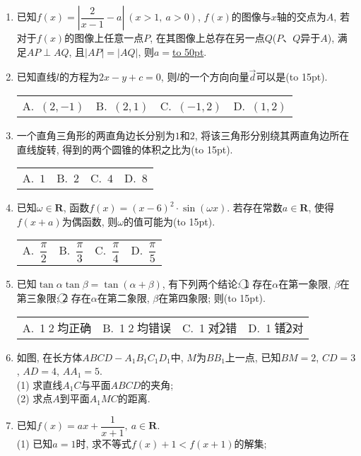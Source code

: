 \documentclass[10pt,a4paper]{article}
\newcommand{\blank}[1]{\underline{\hbox to #1pt{}}}
\newcommand{\bracket}[1]{(\hbox to #1pt{})}
\newcommand{\fourch}[4]{\par\begin{tabular}{p{.23\textwidth}p{.23\textwidth}p{.23\textwidth}p{.23\textwidth}}
A.~#1 &B.~#2& C.~#3& D.~#4
\end{tabular}}
\begin{document}
\begin{enumerate}[1.]
\item 已知$f(x)=\left|\dfrac{2}{x-1}-a\right| \ (x>1, \ a>0)$, $f(x)$的图像与$x$轴的交点为$A$, 若对于$f(x)$的图像上任意一点$P$, 在其图像上总存在另一点$Q$($P$、$Q$异于$A$), 满足$AP\perp AQ$, 且$|AP|=|AQ|$, 则$a=$\blank{50}.
\item 已知直线$l$的方程为$2x-y+c=0$, 则$l$的一个方向向量$\overrightarrow{d}$可以是\bracket{15}.
\fourch{$(2,-1)$}{$(2,1)$}{$(-1,2)$}{$(1,2)$}
\item 一个直角三角形的两直角边长分别为$1$和$2$, 将该三角形分别绕其两直角边所在直线旋转, 得到的两个圆锥的体积之比为\bracket{15}.
\fourch{$1$}{$2$}{$4$}{$8$}
\item 已知$\omega\in \mathbf{R}$, 函数$f(x)=(x-6)^2\cdot \sin (\omega x)$. 若存在常数$a\in \mathbf{R}$, 使得$f(x+a)$为偶函数, 则$\omega$的值可能为\bracket{15}.
\fourch{$\dfrac{\pi}{2}$}{$\dfrac{\pi}{3}$}{$\dfrac{\pi}{4}$}{$\dfrac{\pi}{5}$}
\item 已知$\tan\alpha\tan\beta=\tan(\alpha+\beta)$, 有下列两个结论: \textcircled{1} 存在$\alpha$在第一象限, $\beta$在第三象限; \textcircled{2} 存在$\alpha$在第二象限, $\beta$在第四象限; 则\bracket{15}.
\fourch{\textcircled{1}\textcircled{2}均正确}{\textcircled{1}\textcircled{2}均错误}{\textcircled{1}对\textcircled{2}错}{\textcircled{1}错\textcircled{2}对}
\item 如图, 在长方体$ABCD-A_1B_1C_1D_1$中, $M$为$BB_1$上一点, 已知$BM=2$, $CD=3$, $AD=4$, $AA_1=5$. \\
(1) 求直线$A_1C$与平面$ABCD{}$的夹角;\\
(2) 求点$A$到平面$A_1MC$的距离.
\begin{center}
\end{center}
\item 已知$f(x)=ax+\dfrac{1}{x+1}, \ a\in \mathbf{R}$.\\
(1) 已知$a=1$时, 求不等式$f(x)+1<f(x+1)$的解集;\\

\end{enumerate}
\end{document}

